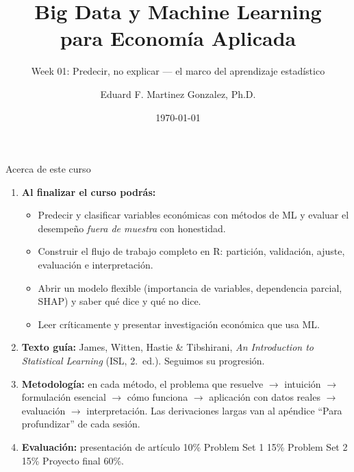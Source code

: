 \documentclass{beamer}
\title[BDML]{Big Data y Machine Learning \\ para Economía Aplicada}
\subtitle{Week 01: Predecir, no explicar --- el marco del aprendizaje estadístico}
\author{Eduard F. Martinez Gonzalez, Ph.D.}
\institute[]{Departamento de Economía, Universidad Icesi}
\date{\today}
\newcommand{\1}{\mathbb{I}}
\begin{document}
\begin{frame}
\titlepage
\end{frame}


\begin{frame}{Acerca de este curso}
\small
\begin{enumerate}\itemsep3pt
\item \textbf{Al finalizar el curso podrás:}
\begin{itemize}\itemsep2pt
  \item Predecir y clasificar variables económicas con métodos de ML y evaluar el desempeño \emph{fuera de muestra} con honestidad.
  \item Construir el flujo de trabajo completo en R: partición, validación, ajuste, evaluación e interpretación.
  \item Abrir un modelo flexible (importancia de variables, dependencia parcial, SHAP) y saber qué dice y qué no dice.
  \item Leer críticamente y presentar investigación económica que usa ML.
\end{itemize}
\item \textbf{Texto guía:} James, Witten, Hastie \& Tibshirani, \emph{An Introduction to Statistical Learning} (ISL, 2.\ ed.). Seguimos su progresión.
\item \textbf{Metodología:} en cada método, el problema que resuelve $\rightarrow$ intuición $\rightarrow$ formulación esencial $\rightarrow$ cómo funciona $\rightarrow$ aplicación con datos reales $\rightarrow$ evaluación $\rightarrow$ interpretación. Las derivaciones largas van al apéndice ``Para profundizar'' de cada sesión.
\item \textbf{Evaluación:} presentación de artículo 10\% \quad Problem Set 1 15\% \quad Problem Set 2 15\% \quad Proyecto final 60\%.
\end{enumerate}
\end{frame}
\end{document}
